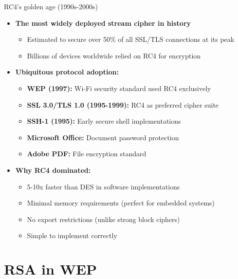 \documentclass[aspectratio=169, lualatex, handout]{beamer}
\begin{document}
\begin{frame}{RC4's golden age (1990s-2000s)}
	\begin{itemize}
		\item \textbf{The most widely deployed stream cipher in history}
		      \begin{itemize}
			      \item Estimated to secure over 50\% of all SSL/TLS connections at its peak
			      \item Billions of devices worldwide relied on RC4 for encryption
		      \end{itemize}
		\item \textbf{Ubiquitous protocol adoption:}
		      \begin{itemize}
			      \item \textbf{WEP (1997):} Wi-Fi security standard used RC4 exclusively
			      \item \textbf{SSL 3.0/TLS 1.0 (1995-1999):} RC4 as preferred cipher suite
			      \item \textbf{SSH-1 (1995):} Early secure shell implementations
			      \item \textbf{Microsoft Office:} Document password protection
			      \item \textbf{Adobe PDF:} File encryption standard
		      \end{itemize}
		\item \textbf{Why RC4 dominated:}
		      \begin{itemize}
			      \item 5-10x faster than DES in software implementations
			      \item Minimal memory requirements (perfect for embedded systems)
			      \item No export restrictions (unlike strong block ciphers)
			      \item Simple to implement correctly
		      \end{itemize}
	\end{itemize}
\end{frame}

\section{RSA in WEP}
\end{document}
